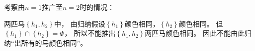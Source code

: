 \begin{questions}
    \begin{solution}
        考察由$n=1$推广至$n=2$时的情况：

        两匹马$\left\{ h_1, h_2 \right\}$中，
        由归纳假设$\left\{h_1\right\}$颜色相同，$\left\{h_2\right\}$颜色相同。
        但$\left\{h_1\right\} \cap \left\{h_2\right\} = \Phi$，
        所以不能推出$\left\{h_1,h_2\right\}$两匹马颜色相同。
        因此不能由此归纳“出所有的马颜色相同”。
    \end{solution}

\end{questions}

